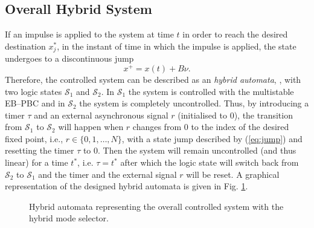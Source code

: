 \subsection{Overall Hybrid System}
%
If an impulse is applied to the system at time $t$  in order to reach the desired destination $x_j^*$, in the instant of time in which the impulse is applied, the state undergoes to a discontinuous jump
%
\begin{equation}\label{eq:jump}
    x^+ = x(t) + B\nu.
\end{equation}
%
Therefore, the controlled system can be described as an \textit{hybrid automata},  \cite{van2000introduction}, with two logic states $\mathcal{S}_1$ and $\mathcal{S}_2$. In $\mathcal{S}_1$ the system is controlled with the multistable EB--PBC and in $\mathcal{S}_2$ the system is completely uncontrolled. Thus, by introducing a timer $\tau$ and an external asynchronous signal $r$ (initialised to $0$), the transition from $\mathcal{S}_1$ to $\mathcal{S}_2$ will happen when $r$ changes from $0$ to the index of the desired fixed point, i.e., $r\in\{0,1,\dots,N\}$, with a state jump described by (\ref{eq:jump}) and resetting the timer $\tau$ to $0$. Then the system will remain uncontrolled (and thus linear) for a time $t^*$, i.e. $\tau = t^*$ after which the logic state will switch back from $\mathcal{S}_2$ to $\mathcal{S}_1$  and the timer and the external signal $r$ will be reset. A graphical representation of the designed hybrid automata is given in Fig. \ref{fig:automata}. 
%
\begin{figure}[!t]
	\centering
	
	\vspace{-5mm}
	\caption{\footnotesize Hybrid automata representing the overall controlled system with the hybrid mode selector.}
	\label{fig:automata}
\end{figure}
%
